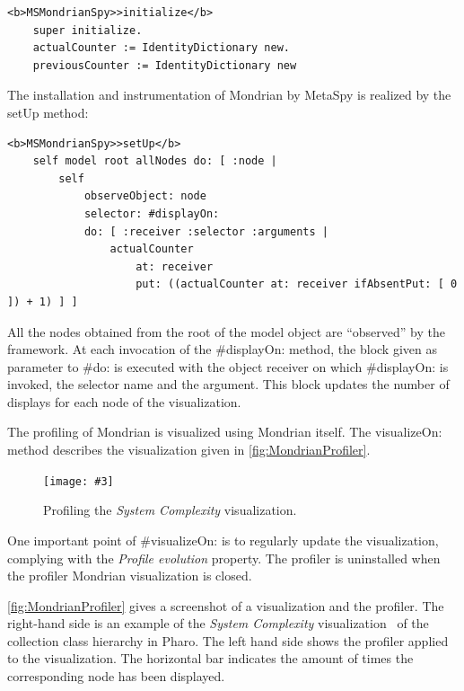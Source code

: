 \documentclass[runningheads]{llncs}
\newcommand{\project}{{\sc MetaSpy}\xspace}
\newcommand{\ct}{\lstinline[backgroundcolor=\color{white},basicstyle=\footnotesize\ttfamily]}
\newcommand{\ab}[1]{\nb{Alexandre}{blue}{#1}}
\newcommand{\lr}[1]{\nb{Lukas}{orange}{#1}}
\newcommand{\fig}[4]{
    \begin{figure}[#1]
        \centering
        \texttt{[image: \#3]}
        \caption{\label{fig:#3}#4}
    \end{figure}}
\newcommand{\co}[1]{{\sf #1}}
\begin{document}
\begin{lstlisting}
<b>MSMondrianSpy>>initialize</b>
    super initialize.
    actualCounter := IdentityDictionary new.
    previousCounter := IdentityDictionary new
\end{lstlisting}

The installation and instrumentation of Mondrian by \project is realized by the {\sf setUp} method:

\begin{lstlisting}
<b>MSMondrianSpy>>setUp</b>
    self model root allNodes do: [ :node |
        self 
            observeObject: node
            selector: #displayOn:
            do: [ :receiver :selector :arguments |
                actualCounter 
                    at: receiver
                    put: ((actualCounter at: receiver ifAbsentPut: [ 0 ]) + 1) ] ]
\end{lstlisting}

All the nodes obtained from the root of the model object are ``observed'' by the framework. At each invocation of the {\sf \#displayOn:} method, the block given as parameter to {\sf \#do:} is executed with the object receiver on which {\sf \#displayOn:} is invoked, the selector name and the argument. This block updates the number of displays for each node of the visualization.

The profiling of Mondrian is visualized using Mondrian itself. The \co{visualizeOn:} method describes the visualization given in \autoref{fig:MondrianProfiler}.


\fig{}{.8}{MondrianProfiler}{Profiling the \emph{System Complexity} visualization.}

One important point of \co{\#visualizeOn:} is to regularly update the visualization, complying with the \emph{Profile evolution} property. The profiler is uninstalled when the profiler Mondrian visualization is closed.

\autoref{fig:MondrianProfiler} gives a screenshot of a visualization and the profiler. The right-hand side is an example of the \emph{System Complexity} visualization~\cite{Lanz03d} of the collection class hierarchy in Pharo. The left hand side shows the profiler applied to the visualization. The horizontal bar indicates the amount of times the corresponding node has been displayed. %
\end{document}

